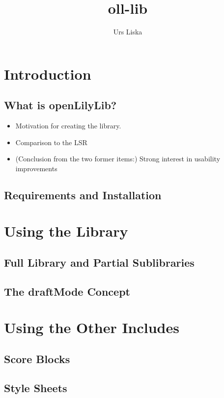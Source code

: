 \documentclass{OLLbook}
\title{oll-lib}
\author{Urs Liska}
\begin{document}
\maketitle
\tableofcontents

\chapter{Introduction}

\section{What is openLilyLib?}
\begin{itemize}
\item Motivation for creating the library.
\item Comparison to the LSR
\item (Conclusion from the two former items:) Strong interest in usability improvements
\end{itemize}

\section{Requirements and Installation}


\chapter{Using the Library}

\section{Full Library and Partial Sublibraries}

\section{The draftMode Concept}




\chapter{Using the Other Includes}

\section{Score Blocks}

\section{Style Sheets}
\end{document}
